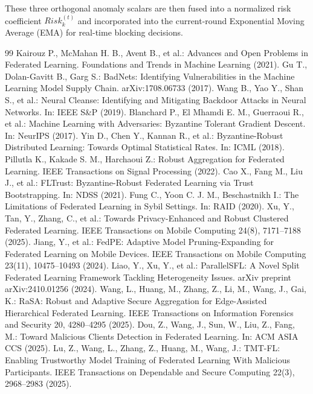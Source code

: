 \documentclass[runningheads]{llncs}
\begin{document}
These three orthogonal anomaly scalars are then fused into a normalized risk coefficient $Risk_{k}^{(t)}$ and incorporated into the current-round Exponential Moving Average (EMA) for real-time blocking decisions.

\begin{thebibliography}{99}
 Kairouz P., McMahan H. B., Avent B., et al.: Advances and Open Problems in Federated Learning. Foundations and Trends in Machine Learning (2021).
 Gu T., Dolan-Gavitt B., Garg S.: BadNets: Identifying Vulnerabilities in the Machine Learning Model Supply Chain. arXiv:1708.06733 (2017).
 Wang B., Yao Y., Shan S., et al.: Neural Cleanse: Identifying and Mitigating Backdoor Attacks in Neural Networks. In: IEEE S\&P (2019).
 Blanchard P., El Mhamdi E. M., Guerraoui R., et al.: Machine Learning with Adversaries: Byzantine Tolerant Gradient Descent. In: NeurIPS (2017).
 Yin D., Chen Y., Kannan R., et al.: Byzantine-Robust Distributed Learning: Towards Optimal Statistical Rates. In: ICML (2018).
 Pillutla K., Kakade S. M., Harchaoui Z.: Robust Aggregation for Federated Learning. IEEE Transactions on Signal Processing (2022).
 Cao X., Fang M., Liu J., et al.: FLTrust: Byzantine-Robust Federated Learning via Trust Bootstrapping. In: NDSS (2021).
 Fung C., Yoon C. J. M., Beschastnikh I.: The Limitations of Federated Learning in Sybil Settings. In: RAID (2020).
 Xu, Y., Tan, Y., Zhang, C., et al.: Towards Privacy-Enhanced and Robust Clustered Federated Learning. IEEE Transactions on Mobile Computing 24(8), 7171--7188 (2025).
 Jiang, Y., et al.: FedPE: Adaptive Model Pruning-Expanding for Federated Learning on Mobile Devices. IEEE Transactions on Mobile Computing 23(11), 10475--10493 (2024).
 Liao, Y., Xu, Y., et al.: ParallelSFL: A Novel Split Federated Learning Framework Tackling Heterogeneity Issues. arXiv preprint arXiv:2410.01256 (2024).
 Wang, L., Huang, M., Zhang, Z., Li, M., Wang, J., Gai, K.: RaSA: Robust and Adaptive Secure Aggregation for Edge-Assisted Hierarchical Federated Learning. IEEE Transactions on Information Forensics and Security 20, 4280--4295 (2025).
 Dou, Z., Wang, J., Sun, W., Liu, Z., Fang, M.: Toward Malicious Clients Detection in Federated Learning. In: ACM ASIA CCS (2025).
 Lu, Z., Wang, L., Zhang, Z., Huang, M., Wang, J.: TMT-FL: Enabling Trustworthy Model Training of Federated Learning With Malicious Participants. IEEE Transactions on Dependable and Secure Computing 22(3), 2968--2983 (2025).

\end{thebibliography}
\end{document}

